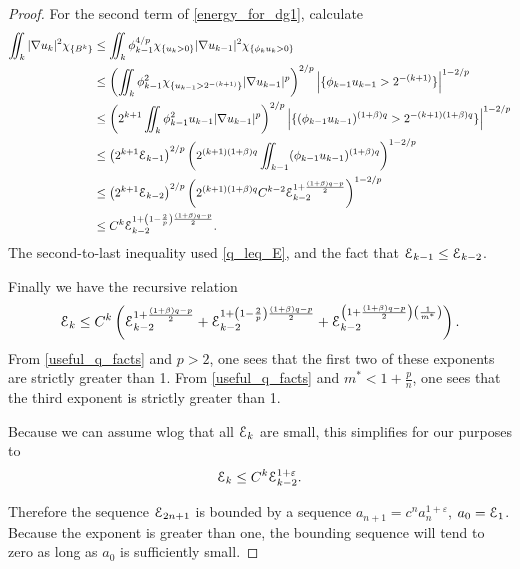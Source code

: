 \begin{proof}
For the second term of \eqref{energy_for_dg1}, calculate
\begin{align*}
\iint_k |\nabla u_k|^2 \chi_{\{B^k\}} &\leq \iint_k \phi_{k-1}^{4/p} \chi_{\{u_k > 0\}}|\nabla u_{k-1}|^2 \chi_{\{\phi_k u_k > 0\}}
\\ &\leq \left(  \iint_k \phi_{k-1}^2 \chi_{\{u_{k-1} > 2^{-(k+1)}\}} |\nabla u_{k-1}|^p  \right)^{2/p} \left\lvert \{\phi_{k-1} u_{k-1} > 2^{-(k+1)}\} \right\rvert^{1-2/p}
\\ &\leq \left(  2^{k+1} \iint_k \phi_{k-1}^2 u_{k-1} |\nabla u_{k-1}|^p  \right)^{2/p} \left\lvert \{(\phi_{k-1} u_{k-1})^{(1+\beta)q} > 2^{-(k+1)(1+\beta)q}\} \right\rvert^{1-2/p}
\\ &\leq \left(  2^{k+1} \mathcal{E}_{k-1}  \right)^{2/p} \left(  2^{(k+1)(1+\beta)q} \iint_{k-1} (\phi_{k-1} u_{k-1})^{(1+\beta)q}  \right)^{1-2/p}
\\ &\leq \left(  2^{k+1} \mathcal{E}_{k-2}  \right)^{2/p} \left(  2^{(k+1)(1+\beta)q} C^{k-2} \mathcal{E}_{k-2}^{1+\frac{(1+\beta)q-p}{2}}  \right)^{1-2/p}
\\ &\leq C^k \mathcal{E}_{k-2}^{1 + \left( 1-\frac{2}{p} \right)\frac{(1+\beta)q-p}{2}}.
\end{align*}
The second-to-last inequality used \eqref{q_leq_E}, and the fact that $\mathcal{E}_{k-1} \leq \mathcal{E}_{k-2}$.  

Finally we have the recursive relation 
\begin{equation}
\mathcal{E}_k \leq C^k \left( \mathcal{E}_{k-2}^{1 + \frac{(1+\beta)q-p}{2}} + \mathcal{E}_{k-2}^{1 + \left( 1-\frac{2}{p} \right)\frac{(1+\beta)q-p}{2} } + \mathcal{E}_{k-2}^{\left( 1 + \frac{(1+\beta)q-p}{2} \right) \left( \frac{1}{m^\ast} \right)}  \right). 
\end{equation}
From \eqref{useful_q_facts} and $p > 2$, one sees that the first two of these exponents are strictly greater than 1.  From \eqref{useful_q_facts} and $m^\ast < 1 + \frac{p}{n}$, one sees that the third exponent is strictly greater than 1.  


Because we can assume wlog that all $\mathcal{E}_k$ are small, this simplifies for our purposes to 
\[ \mathcal{E}_k \leq C^k  \mathcal{E}_{k-2}^{1 + \varepsilon }. \]

Therefore the sequence $\mathcal{E}_{2n+1}$ is bounded by a sequence $a_{n+1} = c^n a_n^{1+\varepsilon}$, $a_0 = \mathcal{E}_1$.  Because the exponent is greater than one, the bounding sequence will tend to zero as long as $a_0$ is sufficiently small.  


\end{proof}
